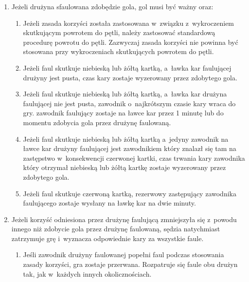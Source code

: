 \documentclass[12pt]{article}
\begin{document}
\begin{enumerate}
	\item
	      Jeżeli drużyna sfaulowana zdobędzie gola, gol musi być ważny oraz:

	      \begin{enumerate}
		      \item
		            Jeżeli zasada korzyści została zastosowana w~związku z~wykroczeniem
		            skutkującym powrotem do pętli, należy zastosować standardową
		            procedurę powrotu do pętli. Zazwyczaj zasada korzyści nie powinna
		            być stosowana przy wykroczeniach skutkujących powrotem do pętli.
		      \item
		            Jeżeli faul skutkuje niebieską lub żółtą kartką, a~ławka kar
		            faulującej drużyny jest pusta, czas kary zostaje wyzerowany przez
		            zdobytego gola.
		      \item
		            Jeżeli faul skutkuje niebieską lub żółtą kartką, a~ławka kar drużyna
		            faulującej nie jest pusta, zawodnik o~najkrótszym czasie kary wraca
		            do gry. zawodnik faulujący zostaje na ławce kar przez 1 minutę lub
		            do momentu zdobycia gola przez drużynę faulowaną.
		      \item
		            Jeżeli faul skutkuje niebieską lub żółtą kartką a~jedyny zawodnik na
		            ławce kar drużyny faulującej jest zawodnikiem który znalazł się tam
		            na zastępstwo w~konsekwencji czerwonej kartki, czas trwania kary
		            zawodnika który otrzymał niebieską lub żółtą kartkę zostaje
		            wyzerowany przez zdobytego gola.
		      \item
		            Jeżeli faul skutkuje czerwoną kartką, rezerwowy zastępujący
		            zawodnika faulującego zostaje wysłany na ławkę kar na dwie minuty.
	      \end{enumerate}
	\item
	      Jeżeli korzyść odniesiona przez drużynę faulującą zmniejszyła się z~powodu innego niż zdobycie gola przez drużynę faulowaną, sędzia
	      natychmiast zatrzymuje grę i~wyznacza odpowiednie kary za wszystkie
	      faule.

	      \begin{enumerate}
		      \item
		            Jeśli zawodnik drużyny faulowanej popełni faul podczas stosowania
		            zasady korzyści, gra zostaje przerwana. Rozpatruje się faule obu
		            drużyn tak, jak w~każdych innych okolicznościach.


\end{enumerate}
\end{enumerate}
\end{document}
